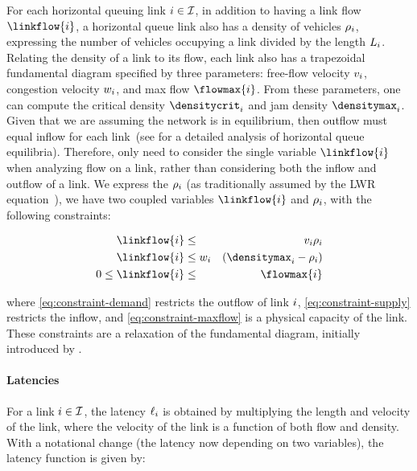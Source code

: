 For each horizontal queuing link $i\in\mathcal{I}$, in addition to
having a link flow $\linkflow{\link}$, a horizontal queue link also
has a density of vehicles $\rho_{i}$, expressing the number
of vehicles occupying a link divided by the length $L_{i}$.
Relating the density of a link to its flow, each link also has a trapezoidal
fundamental diagram specified by three parameters: free-flow velocity
$v_{i}$, congestion velocity $w_{i}$, and
max flow $\flowmax{\link}$.
From these parameters, one can compute the critical density $\densitycrit_{\link}$
and jam density $\densitymax_{\link}$. Given that we are assuming
the network is in equilibrium, then outflow must equal inflow for
each link~(see \cite{gomes2008behavior} for a detailed analysis
of horizontal queue equilibria). Therefore, only need to consider
the single variable $\linkflow{\link}$ when analyzing flow on a link,
rather than considering both the inflow and outflow of a link. We
express the $\rho_{i}$ (as traditionally assumed by the LWR
equation~\cite{daganzo1994cell,daganzo1995cell,lighthill1955kinematic,richards1956shock}),
we have two coupled variables $\linkflow{\link}$ and $\rho_{i}$,
with the following constraints:

\begin{eqnarray}
\linkflow{\link} & \le & \ffspeed_{\link}\density_{\link}\label{eq:constraint-demand}\\
\linkflow{\link} & \le\congspeed_{\link} & \left(\densitymax_{\link}-\density_{\link}\right)\label{eq:constraint-supply}\\
0\le\linkflow{\link} & \le & \flowmax{\link}\label{eq:constraint-maxflow}
\end{eqnarray}


where \eqref{eq:constraint-demand} restricts the outflow of link
$i$, \eqref{eq:constraint-supply} restricts the inflow,
and \eqref{eq:constraint-maxflow} is a physical capacity of the
link. These constraints are a relaxation of the fundamental diagram,
initially introduced by \cite{gomes2006optimal}.


\paragraph{Latencies}

For a link $i\in\mathcal{I}$, the latency $\ell_{i}$ is obtained
by multiplying the length and velocity of the link, where the velocity
of the link is a function of both flow and density\@. With a notational
change (the latency now depending on two variables), the latency function
is given by:

